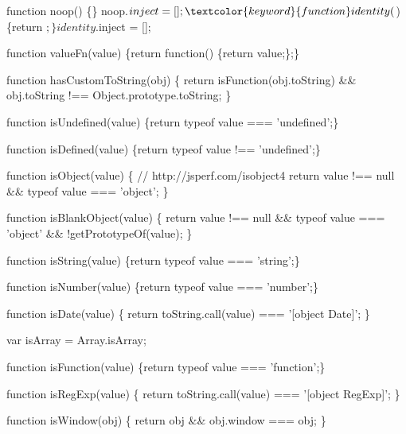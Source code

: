 \begin{DoxyCodeInclude}
\textcolor{keyword}{function} noop() \{\}
noop.$inject = [];


\textcolor{keyword}{function} identity($) \{\textcolor{keywordflow}{return} $;\}
identity.$inject = [];


\textcolor{keyword}{function} valueFn(value) \{\textcolor{keywordflow}{return} \textcolor{keyword}{function}() \{\textcolor{keywordflow}{return} value;\};\}

\textcolor{keyword}{function} hasCustomToString(obj) \{
  \textcolor{keywordflow}{return} isFunction(obj.toString) && obj.toString !== Object.prototype.toString;
\}


\textcolor{keyword}{function} isUndefined(value) \{\textcolor{keywordflow}{return} typeof value === \textcolor{stringliteral}{'undefined'};\}


\textcolor{keyword}{function} isDefined(value) \{\textcolor{keywordflow}{return} typeof value !== \textcolor{stringliteral}{'undefined'};\}


\textcolor{keyword}{function} isObject(value) \{
  \textcolor{comment}{// http://jsperf.com/isobject4}
  \textcolor{keywordflow}{return} value !== null && typeof value === \textcolor{stringliteral}{'object'};
\}


\textcolor{keyword}{function} isBlankObject(value) \{
  \textcolor{keywordflow}{return} value !== null && typeof value === \textcolor{stringliteral}{'object'} && !getPrototypeOf(value);
\}


\textcolor{keyword}{function} isString(value) \{\textcolor{keywordflow}{return} typeof value === \textcolor{stringliteral}{'string'};\}


\textcolor{keyword}{function} isNumber(value) \{\textcolor{keywordflow}{return} typeof value === \textcolor{stringliteral}{'number'};\}


\textcolor{keyword}{function} isDate(value) \{
  \textcolor{keywordflow}{return} toString.call(value) === \textcolor{stringliteral}{'[object Date]'};
\}


var isArray = Array.isArray;

\textcolor{keyword}{function} isFunction(value) \{\textcolor{keywordflow}{return} typeof value === \textcolor{stringliteral}{'function'};\}


\textcolor{keyword}{function} isRegExp(value) \{
  \textcolor{keywordflow}{return} toString.call(value) === \textcolor{stringliteral}{'[object RegExp]'};
\}


\textcolor{keyword}{function} isWindow(obj) \{
  \textcolor{keywordflow}{return} obj && obj.window === obj;
\}



\end{DoxyCodeInclude}

